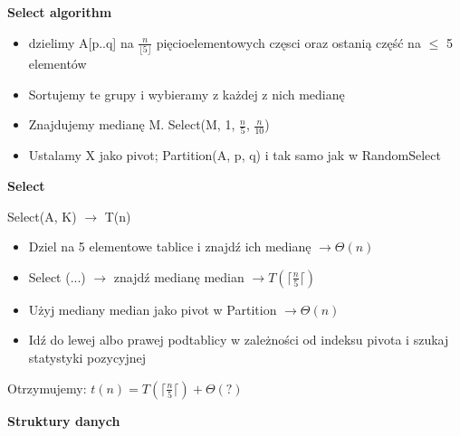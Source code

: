 \documentclass{article}
\begin{document}
    \vspace{1\baselineskip}
    \textbf{Select algorithm} \par
    \begin{itemize}
        \item dzielimy A[p..q] na $\frac{n}{\lfloor 5 \rfloor}$ pięcioelementowych częsci
        oraz ostanią część na $\leq$ 5 elementów
        \item Sortujemy te grupy i wybieramy z każdej z nich medianę
        \item Znajdujemy medianę M. Select(M, 1, $\frac{n}{5}$, $\frac{n}{10}$)
        \item Ustalamy X jako pivot; Partition(A, p, q) i tak samo jak w RandomSelect
    \end{itemize}

    \textbf{Select} \par
    Select(A, K) $\rightarrow$ T(n) \par
    \begin{itemize}
        \item Dziel na 5 elementowe tablice i znajdź ich medianę $\rightarrow \Theta(n)$
        \item Select (...) $\rightarrow$ znajdź medianę median $\rightarrow T(\lceil{\frac{n}{5}}\lceil)$ \par
        \item Użyj mediany median jako pivot w Partition $\rightarrow \Theta(n)$
        \item Idź do lewej albo prawej podtablicy w zależności od indeksu pivota i szukaj statystyki pozycyjnej
    \end{itemize}
    Otrzymujemy: $t(n) = T(\lceil{\frac{n}{5}}\lceil) + \Theta(?)$ \par
    \vspace{9\baselineskip}
    
    \textbf{Struktury danych} \par
\end{document}
